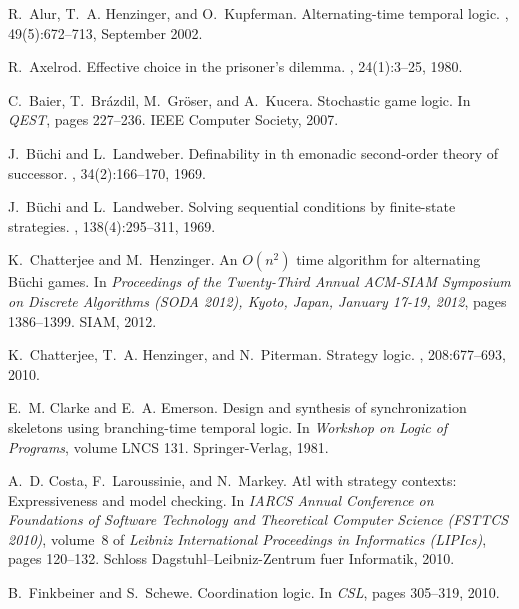 \documentclass{llncs}
\begin{document}
\begin{thebibliography}{10}

R.~Alur, T.~A. Henzinger, and O.~Kupferman.
\newblock Alternating-time temporal logic.
, 49(5):672--713, September 2002.

R.~Axelrod.
\newblock Effective choice in the prisoner's dilemma.
, 24(1):3--25, 1980.

C.~Baier, T.~Br\'azdil, M.~Gr\"oser, and A.~Kucera.
\newblock Stochastic game logic.
\newblock In {\em QEST}, pages 227--236. IEEE Computer Society, 2007.

J.~B\"uchi and L.~Landweber.
\newblock Definability in th emonadic second-order theory of successor.
, 34(2):166--170, 1969.

J.~B\"uchi and L.~Landweber.
\newblock Solving sequential conditions by finite-state strategies.
, 138(4):295--311, 1969.

K.~Chatterjee and M.~Henzinger.
\newblock An $O(n^2)$ time algorithm for alternating
  B{\"u}chi games.
\newblock In {\em Proceedings of the Twenty-Third Annual ACM-SIAM Symposium on
  Discrete Algorithms (SODA 2012), Kyoto, Japan, January 17-19, 2012}, pages
  1386--1399. SIAM, 2012.

K.~Chatterjee, T.~A. Henzinger, and N.~Piterman.
\newblock Strategy logic.
, 208:677--693, 2010.

E.~M. Clarke and E.~A. Emerson.
\newblock Design and synthesis of synchronization skeletons using
  branching-time temporal logic.
\newblock In {\em Workshop on Logic of Programs}, volume LNCS 131.
  Springer-Verlag, 1981.

A.~D. Costa, F.~Laroussinie, and N.~Markey.
\newblock Atl with strategy contexts: Expressiveness and model checking.
\newblock In {\em IARCS Annual Conference on Foundations of Software Technology
  and Theoretical Computer Science (FSTTCS 2010)}, volume~8 of {\em Leibniz
  International Proceedings in Informatics (LIPIcs)}, pages 120--132. Schloss
  Dagstuhl--Leibniz-Zentrum fuer Informatik, 2010.

B.~Finkbeiner and S.~Schewe.
\newblock Coordination logic.
\newblock In {\em CSL}, pages 305--319, 2010.


\end{thebibliography}
\end{document}
